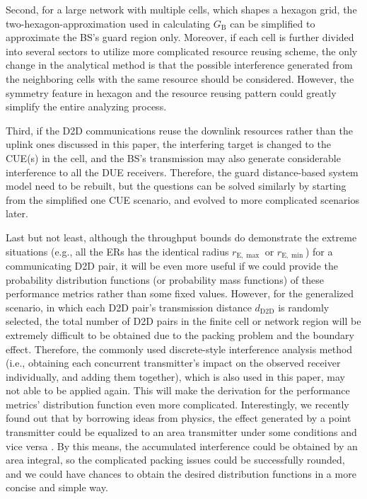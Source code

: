 \documentclass[journal, 10pt]{IEEEtran}
\begin{document}
Second, for a large network with multiple cells, which shapes a
hexagon grid, the two-hexagon-approximation used in calculating
$G_\mathrm{B}$ can be simplified to approximate the BS's guard region
only. Moreover, if each cell is further divided into several sectors
to utilize more complicated resource reusing scheme, the only change
in the analytical method is that the possible interference generated
from the neighboring cells with the same resource should be
considered. However, the symmetry feature in hexagon and the resource
reusing pattern could greatly simplify the entire analyzing process.
 
Third, if the D2D communications reuse the downlink resources rather
than the uplink ones discussed in this paper, the interfering target
is changed to the CUE(s) in the cell, and the BS's transmission may
also generate considerable interference to all the DUE receivers.
Therefore, the guard distance-based system model need to be rebuilt,
but the questions can be solved similarly by starting from the
simplified one CUE scenario, and evolved to more complicated scenarios
later.  


Last but not least, although the throughput bounds do demonstrate the
extreme situations (e.g., all the ERs has the identical radius
$r_\mathrm{E,\max}$ or $r_\mathrm{E,\min}$) for a communicating D2D
pair, it will be even more useful if we could provide the probability
distribution functions (or probability mass functions) of these
performance metrics rather than some fixed values. However, for the
generalized scenario, in which each D2D pair's transmission distance
$d_\mathrm{D2D}$ is randomly selected, the total number of D2D pairs
in the finite cell or network region will be extremely difficult to be
obtained due to the packing problem and the boundary effect.
Therefore, the commonly used discrete-style interference analysis
method (i.e., obtaining each concurrent transmitter's impact on the
observed receiver individually, and adding them together), which is
also used in this paper, may not able to be applied again. This will
make the derivation for the performance metrics' distribution function
even more complicated. Interestingly, we recently found out that by
borrowing ideas from physics, the effect generated by a point
transmitter could be equalized to an area transmitter under some
conditions and vice versa \cite{Ni1406:Power}. By this means, the
accumulated interference could be obtained by an area integral, so the
complicated packing issues could be successfully rounded, and we could
have chances to obtain the desired distribution functions in a more
concise and simple way.
\end{document}
